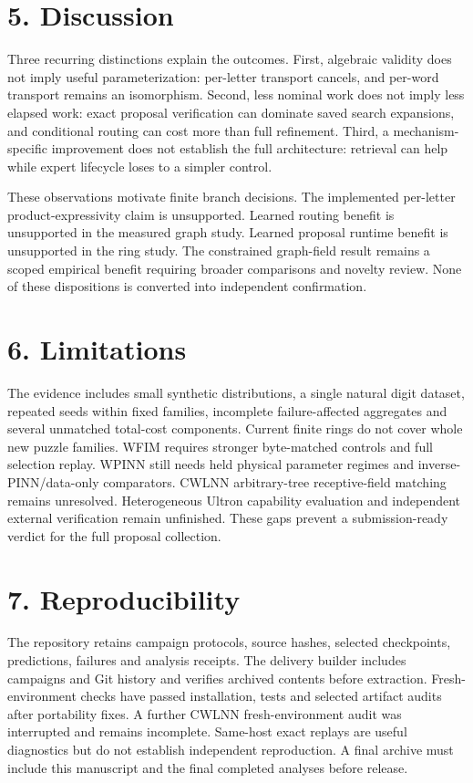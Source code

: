\documentclass[
]{article}
\begin{document}
\section{5. Discussion}\label{discussion}

Three recurring distinctions explain the outcomes. First, algebraic
validity does not imply useful parameterization: per-letter transport
cancels, and per-word transport remains an isomorphism. Second, less
nominal work does not imply less elapsed work: exact proposal
verification can dominate saved search expansions, and conditional
routing can cost more than full refinement. Third, a mechanism-specific
improvement does not establish the full architecture: retrieval can help
while expert lifecycle loses to a simpler control.

These observations motivate finite branch decisions. The implemented
per-letter product-expressivity claim is unsupported. Learned routing
benefit is unsupported in the measured graph study. Learned proposal
runtime benefit is unsupported in the ring study. The constrained
graph-field result remains a scoped empirical benefit requiring broader
comparisons and novelty review. None of these dispositions is converted
into independent confirmation.

\section{6. Limitations}\label{limitations}

The evidence includes small synthetic distributions, a single natural
digit dataset, repeated seeds within fixed families, incomplete
failure-affected aggregates and several unmatched total-cost components.
Current finite rings do not cover whole new puzzle families. WFIM
requires stronger byte-matched controls and full selection replay. WPINN
still needs held physical parameter regimes and inverse-PINN/data-only
comparators. CWLNN arbitrary-tree receptive-field matching remains
unresolved. Heterogeneous Ultron capability evaluation and independent
external verification remain unfinished. These gaps prevent a
submission-ready verdict for the full proposal collection.

\section{7. Reproducibility}\label{reproducibility}

The repository retains campaign protocols, source hashes, selected
checkpoints, predictions, failures and analysis receipts. The delivery
builder includes campaigns and Git history and verifies archived
contents before extraction. Fresh-environment checks have passed
installation, tests and selected artifact audits after portability
fixes. A further CWLNN fresh-environment audit was interrupted and
remains incomplete. Same-host exact replays are useful diagnostics but
do not establish independent reproduction. A final archive must include
this manuscript and the final completed analyses before release.
\end{document}

